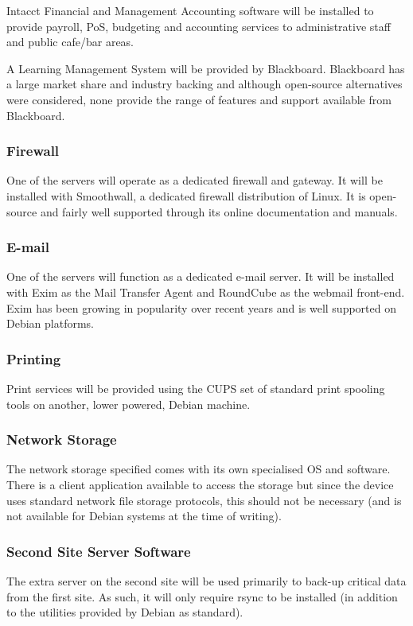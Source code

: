 \documentclass[a4paper, twoside]{article}
\begin{document}
Intacct Financial and Management Accounting software will be installed to
provide payroll, PoS, budgeting and accounting services to administrative staff
and public cafe/bar areas.

A Learning Management System will be provided by Blackboard. Blackboard has a
large market share and industry backing \cite{bb} and although open-source
alternatives were considered, none provide the range of features and support
available from Blackboard.

\subsubsection{Firewall}
One of the servers will operate as a dedicated firewall and gateway. It will be
installed with Smoothwall, a dedicated firewall distribution of Linux. It is
open-source and fairly well supported through its online documentation and
manuals.

\subsubsection{E-mail}
One of the servers will function as a dedicated e-mail server. It will be
installed with Exim as the Mail Transfer Agent and RoundCube as the webmail
front-end. Exim has been growing in popularity over recent years and is well
supported on Debian platforms\cite{exim}.

\subsubsection{Printing}
Print services will be provided using the CUPS set of standard print spooling
tools on another, lower powered, Debian machine.

\subsubsection{Network Storage}
The network storage specified comes with its own specialised OS and software.
There is a client application available to access the storage but since the
device uses standard network file storage protocols, this should not be
necessary (and is not available for Debian systems at the time of writing).

\subsubsection{Second Site Server Software}
\label{sec:secsite}
The extra server on the second site will be used primarily to back-up critical
data from the first site. As such, it will only require rsync to be installed
(in addition to the utilities provided by Debian as standard).
\end{document}
